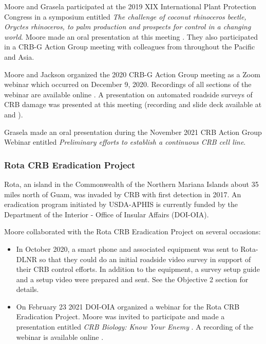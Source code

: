 \documentclass[12pt,letterpaper,english,bibliography=totocnumbered,abstract=on]{scrartcl}
\begin{document}
Moore and Grasela participated at the 2019 XIX International Plant Protection Congress in a symposium entitled \textit{The challenge of coconut rhinoceros beetle, Oryctes rhinoceros, to palm production and prospects for control in a changing world}. Moore made an oral presentation at this meeting \parencite{moore_status_2019}.
They also participated in a CRB-G Action Group meeting with colleagues from throughout the Pacific and Asia.

Moore and Jackson organized the 2020 CRB-G Action Group meeting as a Zoom webinar which occurred on December 9, 2020. Recordings of all sections of the webinar are available online \cite{mooreVideoRecordingCRBG2020}. A presentation on automated roadside surveys of CRB damage was presented at this meeting (recording and slide deck available at \cite{mooreVideoRecordingCRBG2020} and \cite{mooreAutomatedRoadsideVideo2020}).

Grasela made an oral presentation during the November 2021 CRB Action Group Webinar entitled \emph{Preliminary efforts to establish a continuous CRB cell line}.

\subsubsection{Rota CRB Eradication Project}

Rota, an island in the Commonwealth of the Northern Mariana Islands about 35 miles north of Guam, was invaded by CRB with first detection in 2017. An eradication program initiated by USDA-APHIS is currently funded by the Department of the Interior - Office of Insular Affairs (DOI-OIA).

Moore collaborated with the Rota CRB Eradication Project on several occasions:
\begin{itemize}
	
	\item In October 2020, a smart phone and associated equipment was sent to Rota-DLNR so that they could do an initial roadside video survey in support of their CRB control efforts. In addition to the equipment, a survey setup guide \cite{mooreSetAutomatedRoadside2020} and a setup video \cite{mooreYouTubeVideoMounting2020} were prepared and sent. See the Objective 2 section for details.
	
	
	\item On February 23 2021 DOI-OIA organized a webinar for the Rota CRB Eradication Project. Moore was invited to participate and made a presentation entitled \textit{CRB Biology: Know Your Enemy} \cite{mooreCRBBiologyKnow2021}. A recording of the webinar is available online \cite{usdepartmentoftheinterior-officeofinsularaffairsYouTubeVideoCoconut2021}.
	
	
\end{itemize}
\end{document}
